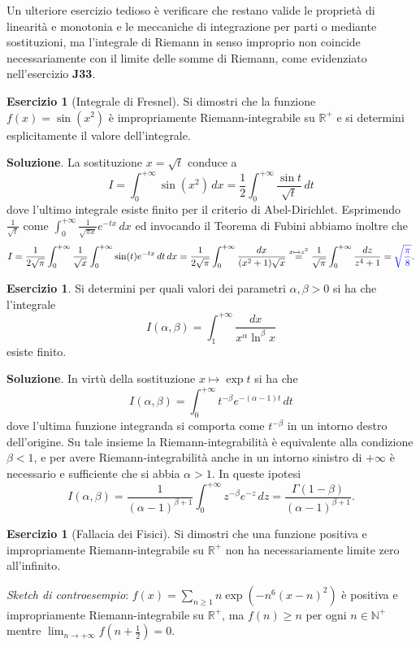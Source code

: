 \documentclass[a4paper,twoside]{article}
\newcommand{\N}{\mathbb{N}}
\newcommand{\R}{\mathbb{R}}
\theoremstyle{definition}
\newtheorem{ex}[theorem]{Esercizio}
\numberwithin{theorem}{section}
\begin{document}
Un ulteriore esercizio tedioso è verificare che restano valide le proprietà di linearità e monotonia e le meccaniche di integrazione per parti o mediante sostituzioni, ma l'integrale di Riemann in senso improprio non coincide necessariamente con il limite delle somme di Riemann, come evidenziato nell'esercizio \textbf{J33}.

\begin{ex}[Integrale di Fresnel] Si dimostri che la funzione $f(x)=\sin(x^2)$ è impropriamente Riemann-integrabile su $\R^+$ e si determini esplicitamente il valore dell'integrale. 
\end{ex}
\textbf{Soluzione}. La sostituzione $x=\sqrt{t}$ conduce a 
$$ I=\int_{0}^{+\infty}\sin(x^2)\,dx = \frac{1}{2}\int_{0}^{+\infty}\frac{\sin t}{\sqrt{t}}\,dt $$ 
dove l'ultimo integrale esiste finito per il criterio di Abel-Dirichlet. Esprimendo $\frac{1}{\sqrt{t}}$ come $\int_{0}^{+\infty}\frac{1}{\sqrt{\pi x}} e^{-tx}\,dx$ ed invocando il Teorema di Fubini abbiamo inoltre che 
$$ I = \frac{1}{2\sqrt{\pi}}\int_{0}^{+\infty}\frac{1}{\sqrt{x}}\int_{0}^{+\infty}\sin(t)e^{-tx}\,dt \,dx = \frac{1}{2\sqrt{\pi}}\int_{0}^{+\infty}\frac{dx}{(x^2+1)\sqrt{x}}\stackrel{x\mapsto z^2}{=}\frac{1}{\sqrt{\pi}}\int_{0}^{+\infty}\frac{dz}{z^4+1}={\color{blue}\sqrt{\frac{\pi}{8}}}. $$

\begin{ex} Si determini per quali valori dei parametri $\alpha,\beta > 0$ si ha che l'integrale 
$$ I(\alpha,\beta) = \int_{1}^{+\infty}\frac{dx}{x^\alpha \ln^\beta x}$$
esiste finito. 
\end{ex}
\textbf{Soluzione}. In virtù della sostituzione $x\mapsto\exp t$ si ha che 
$$ I(\alpha,\beta) = \int_{0}^{+\infty}t^{-\beta} e^{-(\alpha-1)t}\,dt $$
dove l'ultima funzione integranda si comporta come $t^{-\beta}$ in un intorno destro dell'origine. Su tale insieme la Riemann-integrabilità è equivalente alla condizione $\beta < 1$, e per avere Riemann-integrabilità anche in un intorno sinistro di $+\infty$ è necessario e sufficiente che si abbia $\alpha>1$. In queste ipotesi 
$$ I(\alpha,\beta) = \frac{1}{(\alpha-1)^{\beta+1}}\int_{0}^{+\infty} z^{-\beta} e^{-z}\,dz = \frac{\Gamma(1-\beta)}{(\alpha-1)^{\beta+1}}.$$

\begin{ex}[Fallacia dei Fisici] Si dimostri che una funzione positiva e impropriamente Riemann-integrabile su $\R^+$ non ha necessariamente limite zero all'infinito. 
\end{ex}
\emph{Sketch di controesempio}: $f(x) = \sum_{n\geq 1} n\exp\left(-n^6(x-n)^2\right)$ è positiva e impropriamente Riemann-integrabile su $\R^+$, ma $f(n)\geq n$ per ogni $n\in\N^+$ mentre $\lim_{n\to +\infty} f\left(n+\frac{1}{2}\right)=0$.
\end{document}

